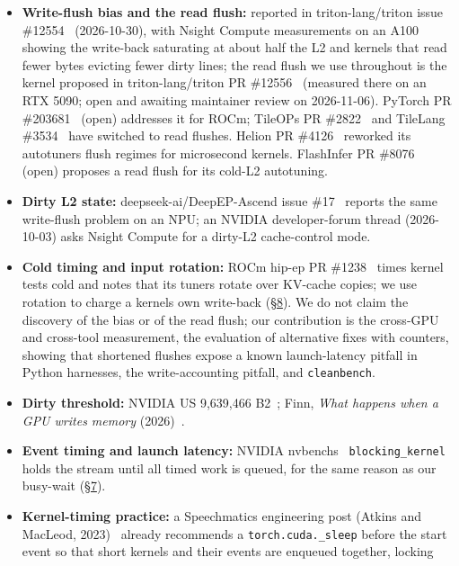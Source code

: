 \documentclass[11pt,a4paper]{article}
\providecommand{\tightlist}{\setlength{\itemsep}{0pt}\setlength{\parskip}{0pt}}
\begin{document}
\begin{itemize}
\tightlist
\item
  \textbf{Write-flush bias and the read flush:} reported in triton-lang/triton issue \#12554~\cite{tr12554} (2026-10-30), with Nsight
  Compute measurements on an A100 showing the write-back saturating at about half the L2 and kernels that read
  fewer bytes evicting fewer dirty lines; the read flush we use throughout is the kernel proposed in
  triton-lang/triton PR \#12556~\cite{tr12556} (measured there on an RTX 5090; open and awaiting maintainer review on 2026-11-06).
  PyTorch PR \#203681~\cite{pt203681} (open) addresses it for ROCm; TileOPs PR \#2822~\cite{tileops2822} and TileLang \#3534~\cite{tilelang3534} have switched to read
  flushes. Helion PR \#4126~\cite{helion4126} reworked its autotuner\textquotesingle s flush regimes for microsecond kernels. FlashInfer PR \#8076~\cite{fi8076} (open)
  proposes a read flush for its cold-L2 autotuning.
\item
  \textbf{Dirty L2 state:} deepseek-ai/DeepEP-Ascend issue \#17~\cite{deepep17} reports the same write-flush problem on an NPU; an NVIDIA
  developer-forum thread (2026-10-03) asks Nsight Compute for a dirty-L2 cache-control mode.
\item
  \textbf{Cold timing and input rotation:} ROCm hip-ep PR \#1238~\cite{hipep1238} times kernel tests cold and notes that its tuners rotate
  over KV-cache copies; we use rotation to charge a kernel\textquotesingle s own write-back (\hyperref[pitfall-3-who-pays-for-a-kernels-own-writes]{\S{}8}). We do not claim the discovery of the bias or of the read flush; our contribution is
  the cross-GPU and cross-tool measurement, the evaluation of alternative fixes with counters, showing that
  shortened flushes expose a known launch-latency pitfall in Python harnesses, the write-accounting pitfall, and
  \texttt{cleanbench}.
\item
  \textbf{Dirty threshold:} NVIDIA US 9,639,466 B2~\cite{patent}; Finn, \emph{What happens when a GPU writes memory} (2026)~\cite{finn}.
\item
  \textbf{Event timing and launch latency:} NVIDIA nvbench\textquotesingle s~\cite{nvbench} \texttt{blocking\_\allowbreak{}kernel} holds the stream until all timed work is
  queued, for the same reason as our busy-wait (\hyperref[pitfall-2-queue-drain]{\S{}7}).
\item
  \textbf{Kernel-timing practice:} a Speechmatics engineering post (Atkins and MacLeod, 2023)~\cite{speechmatics} already recommends a
  \texttt{torch.cuda.\_\allowbreak{}sleep} before the start event so that short kernels and their events are enqueued together, locking

\end{itemize}
\end{document}
